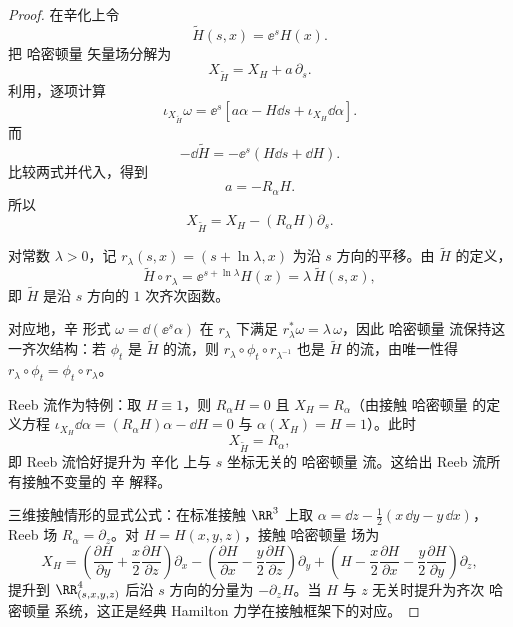 \begin{proof}
在辛化上令
\[
\widetilde H(s,x)=\ee^sH(x).
\]
把 哈密顿量 矢量场分解为
\[
X_{\widetilde H}=X_H+a\,\partial_s.
\]
利用，逐项计算
\[
\iota_{X_{\widetilde H}}\omega
=\ee^s\left[
a\alpha-H\dd s+\iota_{X_H}\dd\alpha
\right].
\]
而
\[
-\dd\widetilde H
=-\ee^s(H\dd s+\dd H).
\]
比较两式并代入，得到
\[
a=-R_\alpha H.
\]
所以
\begin{equation}
{
X_{\widetilde H}
=X_H-(R_\alpha H)\partial_s.
}
\label{eq:math-dg-contact-hamiltonian-lift}
\end{equation}

对常数 $\lambda>0$，记 $r_\lambda(s,x)=(s+\ln\lambda,x)$ 为沿 $s$ 方向的平移。由 $\widetilde H$ 的定义，
\begin{equation*}
\widetilde H\circ r_\lambda
=\ee^{s+\ln\lambda}H(x)
=\lambda\,\widetilde H(s,x),
\end{equation*}
即 $\widetilde H$ 是沿 $s$ 方向的 $1$ 次齐次函数。

对应地，辛 形式 $\omega=\dd(\ee^s\alpha)$ 在 $r_\lambda$ 下满足 $r_\lambda^*\omega=\lambda\,\omega$，因此 哈密顿量 流保持这一齐次结构：若 $\phi_t$ 是 $\widetilde H$ 的流，则 $r_\lambda\circ\phi_t\circ r_{\lambda^{-1}}$ 也是 $\widetilde H$ 的流，由唯一性得 $r_\lambda\circ\phi_t=\phi_t\circ r_\lambda$。

Reeb 流作为特例：取 $H\equiv1$，则 $R_\alpha H=0$ 且 $X_H=R_\alpha$（由接触 哈密顿量 的定义方程 $\iota_{X_H}\dd\alpha=(R_\alpha H)\alpha-\dd H=0$ 与 $\alpha(X_H)=H=1$）。此时
\begin{equation*}
X_{\widetilde H}=R_\alpha,
\end{equation*}
即 Reeb 流恰好提升为 辛化 上与 $s$ 坐标无关的 哈密顿量 流。这给出 Reeb 流所有接触不变量的 辛 解释。

三维接触情形的显式公式：在标准接触 $\RR^3$ 上取 $\alpha=\dd z-\tfrac12(x\,\dd y-y\,\dd x)$，Reeb 场 $R_\alpha=\partial_z$。对 $H=H(x,y,z)$，接触 哈密顿量 场为
\begin{equation*}
X_H
=\left(\frac{\partial H}{\partial y}+\frac{x}{2}\frac{\partial H}{\partial z}\right)\partial_x
-\left(\frac{\partial H}{\partial x}-\frac{y}{2}\frac{\partial H}{\partial z}\right)\partial_y
+\left(H-\frac{x}{2}\frac{\partial H}{\partial x}-\frac{y}{2}\frac{\partial H}{\partial y}\right)\partial_z,
\end{equation*}
提升到 $\RR^4_{(s,x,y,z)}$ 后沿 $s$ 方向的分量为 $-\partial_z H$。当 $H$ 与 $z$ 无关时提升为齐次 哈密顿量 系统，这正是经典 Hamilton 力学在接触框架下的对应。


\end{proof}
